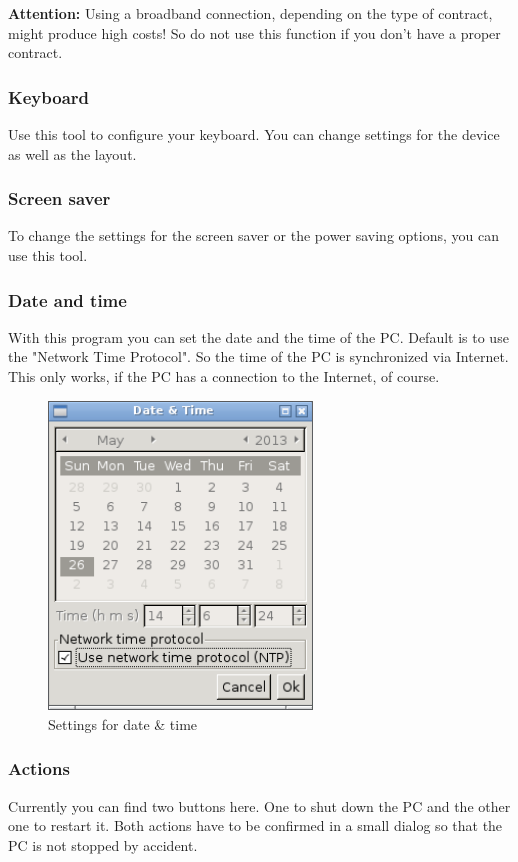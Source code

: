 \documentclass[a4paper,12pt,twoside]{article}
\begin{document}
\bigskip
\textbf{Attention:} Using a broadband connection, depending on the type of
contract, might produce high costs! So do not use this function if you
don't have a proper contract.
\bigskip

\subsubsection{Keyboard}
\label{sct:keyboard}
Use this tool to configure your keyboard. You can change settings for
the device as well as the layout.


\subsubsection{Screen saver}
\label{sct:screen_saver}
To change the settings for the screen saver or the power saving options,
you can use this tool.


\subsubsection{Date and time}
\label{sct:date_time}
With this program you can set the date and the time of the PC. Default
is to use the "Network Time Protocol". So
the time of the PC is synchronized via Internet. This only works, if
the PC has a connection to the Internet, of course.

\begin{figure}
    \centering
    \includegraphics[width=7cm]{efaLiveen-img/efaLiveen-img26.png}
    \caption{Settings for date \& time}
    \label{fig:date_time}
\end{figure}


\subsubsection{Actions}
\label{sct:actions}
Currently you can find two buttons here. One to shut down the PC and the
other one to restart it. Both actions have to be confirmed in a small
dialog so that the PC is not stopped by accident.
\end{document}
